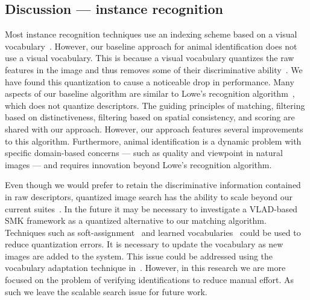     \subsection{Discussion --- instance recognition}
        Most instance recognition techniques use an indexing scheme based on a visual
        vocabulary~\cite{tolias_image_2015, jegou_hamming_2008, philbin_object_2007, cao_learning_2012,
        arandjelovic_all_2013, jegou_negative_2012, chum_fast_2012, gong_multi_scale_2014}. However, our baseline
        approach for animal identification does not use a visual vocabulary. This is because a visual vocabulary
        quantizes the raw features in the image and thus removes some of their discriminative
        ability~\cite{philbin_lost_2008, boiman_defense_2008}. We have found this quantization to cause a
        noticeable drop in performance. Many aspects of our baseline algorithm are similar to Lowe's recognition
        algorithm~\cite{lowe_distinctive_2004}, which does not quantize descriptors. The guiding principles of
        matching, filtering based on distinctiveness, filtering based on spatial consistency, and scoring are
        shared with our approach. However, our approach features several improvements to this algorithm.
        Furthermore, animal identification is a dynamic problem with specific domain-based concerns --- such as
        quality and viewpoint in natural images --- and requires innovation beyond Lowe's recognition algorithm.

        Even though we would prefer to retain the discriminative information contained in raw descriptors,
          quantized image search has the ability to scale beyond our current suites~\cite{chum_fast_2012,
          perronnin_large_scale_2010_1, tolias_image_2015}.
        In the future it may be necessary to investigate a VLAD-based SMK framework as a quantized alternative to
          our matching algorithm.
        Techniques such as soft-assignment~\cite{philbin_lost_2008} and learned
          vocabularies~\cite{mikulik_learning_2010} could be used to reduce quantization errors.
        It is necessary to update the vocabulary as new images are added to the system.
        This issue could be addressed using the vocabulary adaptation technique in~\cite{arandjelovic_all_2013}.
        However, in this research we are more focused on the problem of verifying identifications to reduce
          manual effort.
        As such we leave the scalable search issue for future work.

